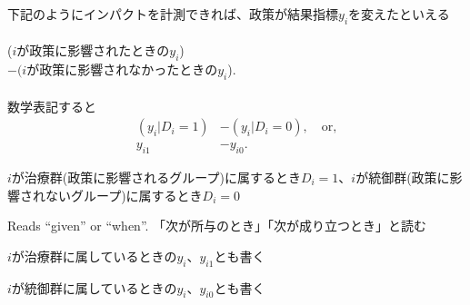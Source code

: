 \begin{frame}{}
下記のようにインパクトを計測できれば、政策が結果指標$y_{i}$を変えたといえる\\~\\

\hspace{2em}($i$が政策に影響されたときの$y_{i}$)\\
\hspace{4em}$-(i$が政策に影響されなかったときの$y_{i}$).\\~\\
\pause
数学表記すると
\[
\begin{aligned}
(y_{i}|D_{i}=1) &- (y_{i}|D_{i}=0), \quad \mbox{or,}\\
y_{i1}&-y_{i0}.%
\end{aligned}
\]
\pause
\begin{description}
\vspace{0.0ex}\setlength{\itemsep}{1.0ex}\setlength{\baselineskip}{12pt}
\item[$D_{i}=0,1$]	%
$i$が治療群(政策に影響されるグループ)に属するとき$D_{i}=1$、$i$が統御群(政策に影響されないグループ)に属するとき$D_{i}=0$%
\item[``$|$''] Reads ``given'' or ``when''. 「次が所与のとき」「次が成り立つとき」と読む
\item[$y_{i}|D_{i}=1$] $i$が治療群に属しているときの$y_{i}$、$y_{i1}$とも書く
\item[$y_{i}|D_{i}=0$] $i$が統御群に属しているときの$y_{i}$、$y_{i0}$とも書く
\end{description}
\end{frame}

